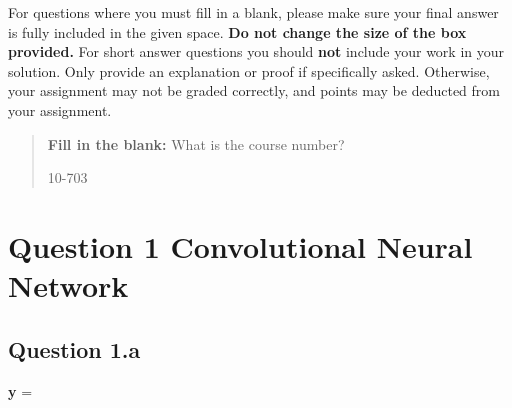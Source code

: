 \documentclass[12pt]{article}
\begin{document}
For questions where you must fill in a blank, please make sure your final answer is fully included in the given space.  \textbf{Do not change the size of the box provided.}  For short answer questions you should \textbf{not} include your work in your solution.  Only provide an explanation or proof if specifically asked.  Otherwise, your assignment may not be graded correctly, and points may be deducted from your assignment.

\begin{quote}
\textbf{Fill in the blank:} What is the course number?

\begin{tcolorbox}[fit,height=1cm, width=4cm, blank, borderline={1pt}{-2pt},nobeforeafter]
    \begin{center}\huge10-703\end{center}
    \end{tcolorbox}
\end{quote}


\newpage
\section*{Question 1 Convolutional Neural Network}
\subsection*{Question 1.a}
    \qquad 
    \textbf{y} =  \begin{tcolorbox}[fit,height=1cm, width=6cm, blank, borderline={1pt}{1pt},nobeforeafter]
            \begin{center}
            \vspace{3mm}
            \end{center}
            \end{tcolorbox}
\end{document}
